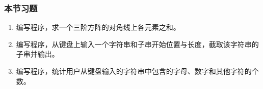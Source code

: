 \begin{frame}
  \frametitle{本节习题}

  \begin{enumerate}
  \item 编写程序，求一个三阶方阵的对角线上各元素之和。
  \item 编写程序，从键盘上输入一个字符串和子串开始位置与长度，截取该字符串的子串并输出。
  \item 编写程序，统计用户从键盘输入的字符串中包含的字母、数字和其他字符的个数。
  \end{enumerate}
\end{frame}



